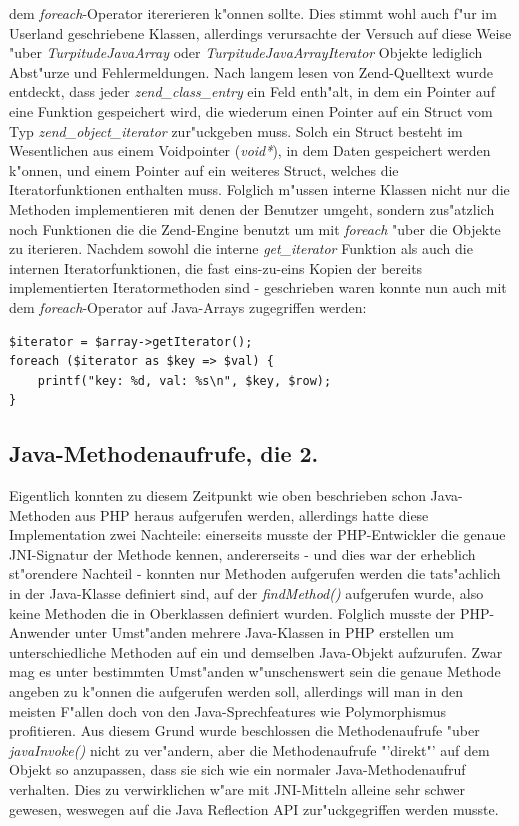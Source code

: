 dem \emph{foreach}-Operator itererieren k"onnen sollte. Dies stimmt wohl auch f"ur im Userland geschriebene Klassen, allerdings verursachte der Versuch auf diese Weise
"uber \emph{TurpitudeJavaArray} oder \emph{TurpitudeJavaArrayIterator} Objekte lediglich Abst"urze und Fehlermeldungen. Nach langem lesen von Zend-Quelltext
wurde entdeckt, dass jeder \emph{zend\_class\_entry} ein Feld enth"alt, in dem ein Pointer auf eine Funktion gespeichert wird, die wiederum einen Pointer auf ein Struct vom Typ
\emph{zend\_object\_iterator} zur"uckgeben muss. Solch ein Struct besteht im Wesentlichen aus einem Voidpointer (\emph{void*}), in dem Daten gespeichert werden k"onnen, und
einem Pointer auf ein weiteres Struct, welches die Iteratorfunktionen enthalten muss. Folglich m"ussen interne Klassen nicht nur die Methoden implementieren mit denen der
Benutzer umgeht, sondern zus"atzlich noch Funktionen die die Zend-Engine benutzt um mit \emph{foreach} "uber die Objekte zu iterieren. Nachdem sowohl die interne
\emph{get\_iterator} Funktion als auch die internen Iteratorfunktionen, die fast eins-zu-eins Kopien der bereits implementierten Iteratormethoden sind - geschrieben waren
konnte nun auch mit dem \emph{foreach}-Operator auf Java-Arrays zugegriffen werden:
\begin{lstlisting}[caption=Java-Array und foreach]
$iterator = $array->getIterator();
foreach ($iterator as $key => $val) {
    printf("key: %d, val: %s\n", $key, $row);
}
\end{lstlisting}

\subsection{Java-Methodenaufrufe, die 2.}
\label{sec:chap1:impl:12}

Eigentlich konnten zu diesem Zeitpunkt wie oben beschrieben schon Java-Methoden aus PHP heraus aufgerufen werden, allerdings hatte
diese Implementation zwei Nachteile: einerseits musste der PHP-Entwickler die genaue JNI-Signatur der Methode kennen, andererseits -
und dies war der erheblich st"orendere Nachteil - konnten nur Methoden aufgerufen werden die tats"achlich in der Java-Klasse definiert
sind, auf der \emph{findMethod()} aufgerufen wurde, also keine Methoden die in Oberklassen definiert wurden. Folglich musste der
PHP-Anwender unter Umst"anden mehrere Java-Klassen in PHP erstellen um unterschiedliche Methoden auf ein und demselben Java-Objekt
aufzurufen. Zwar mag es unter bestimmten Umst"anden w"unschenswert sein die genaue Methode angeben zu k"onnen die aufgerufen werden
soll, allerdings will man in den meisten F"allen doch von den Java-Sprechfeatures wie Polymorphismus profitieren. Aus diesem Grund
wurde beschlossen die Methodenaufrufe "uber \emph{javaInvoke()} nicht zu ver"andern, aber die Methodenaufrufe "'direkt"' auf dem Objekt
so anzupassen, dass sie sich wie ein normaler Java-Methodenaufruf verhalten. Dies zu verwirklichen w"are mit JNI-Mitteln alleine
sehr schwer gewesen, weswegen auf die Java Reflection API zur"uckgegriffen werden musste.

